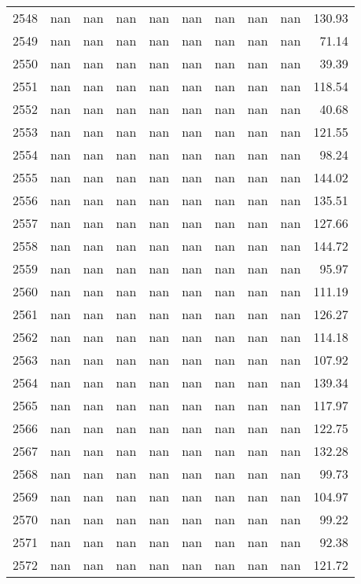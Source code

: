 \begin{tabular}{lrrrrrrrrr}
2548 & nan & nan & nan & nan & nan & nan & nan & nan & 130.93 \\
2549 & nan & nan & nan & nan & nan & nan & nan & nan & 71.14 \\
2550 & nan & nan & nan & nan & nan & nan & nan & nan & 39.39 \\
2551 & nan & nan & nan & nan & nan & nan & nan & nan & 118.54 \\
2552 & nan & nan & nan & nan & nan & nan & nan & nan & 40.68 \\
2553 & nan & nan & nan & nan & nan & nan & nan & nan & 121.55 \\
2554 & nan & nan & nan & nan & nan & nan & nan & nan & 98.24 \\
2555 & nan & nan & nan & nan & nan & nan & nan & nan & 144.02 \\
2556 & nan & nan & nan & nan & nan & nan & nan & nan & 135.51 \\
2557 & nan & nan & nan & nan & nan & nan & nan & nan & 127.66 \\
2558 & nan & nan & nan & nan & nan & nan & nan & nan & 144.72 \\
2559 & nan & nan & nan & nan & nan & nan & nan & nan & 95.97 \\
2560 & nan & nan & nan & nan & nan & nan & nan & nan & 111.19 \\
2561 & nan & nan & nan & nan & nan & nan & nan & nan & 126.27 \\
2562 & nan & nan & nan & nan & nan & nan & nan & nan & 114.18 \\
2563 & nan & nan & nan & nan & nan & nan & nan & nan & 107.92 \\
2564 & nan & nan & nan & nan & nan & nan & nan & nan & 139.34 \\
2565 & nan & nan & nan & nan & nan & nan & nan & nan & 117.97 \\
2566 & nan & nan & nan & nan & nan & nan & nan & nan & 122.75 \\
2567 & nan & nan & nan & nan & nan & nan & nan & nan & 132.28 \\
2568 & nan & nan & nan & nan & nan & nan & nan & nan & 99.73 \\
2569 & nan & nan & nan & nan & nan & nan & nan & nan & 104.97 \\
2570 & nan & nan & nan & nan & nan & nan & nan & nan & 99.22 \\
2571 & nan & nan & nan & nan & nan & nan & nan & nan & 92.38 \\
2572 & nan & nan & nan & nan & nan & nan & nan & nan & 121.72 \\

\end{tabular}
